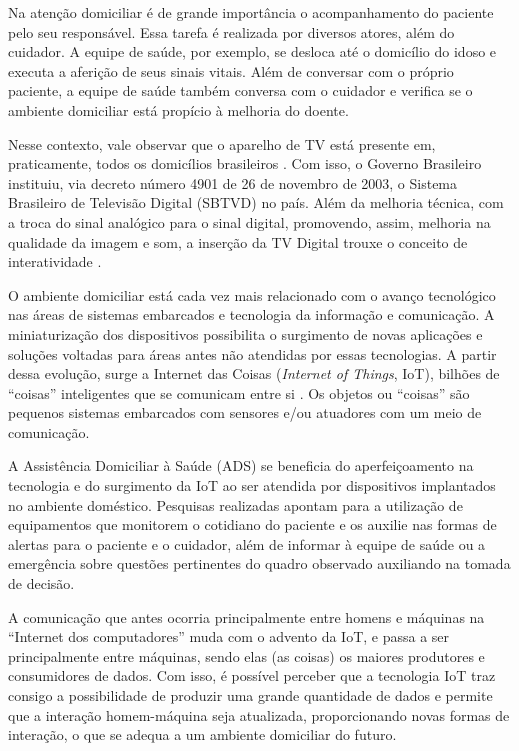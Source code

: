 Na atenção domiciliar é de grande importância o acompanhamento do paciente pelo
seu responsável.  Essa tarefa é realizada por diversos atores, além do
cuidador. A equipe de saúde, por exemplo, se desloca até o domicílio do idoso e
executa a aferição de seus sinais vitais. Além de conversar com o próprio
paciente, a equipe de saúde também conversa com o cuidador e verifica se o
ambiente domiciliar está propício à melhoria do doente.

Nesse contexto, vale observar que o aparelho de TV está presente em,
praticamente, todos os  domicílios brasileiros \cite{ibge2015tv}.  Com isso, o
Governo Brasileiro instituiu, via decreto número 4901 de 26 de novembro de
2003, o Sistema Brasileiro de Televisão Digital (SBTVD) no país.  Além da
melhoria técnica, com a troca do sinal analógico para o sinal  digital,
promovendo, assim, melhoria na qualidade da imagem e som, a inserção  da TV
Digital trouxe o conceito de interatividade \cite{digitaltv2015decree}.

O ambiente domiciliar está cada vez mais relacionado com o avanço tecnológico
nas áreas de sistemas embarcados e tecnologia da informação e comunicação. A
miniaturização dos dispositivos possibilita o surgimento de novas aplicações e
soluções voltadas para áreas antes não atendidas por essas tecnologias.  A
partir dessa evolução, surge a Internet das Coisas (\textit{Internet of
Things}, IoT), bilhões de ``coisas'' inteligentes que se comunicam entre si
\cite{li2015internet}. Os objetos ou ``coisas'' são pequenos sistemas
embarcados com sensores e/ou atuadores com um meio de comunicação. 

A Assistência Domiciliar à Saúde (ADS) se beneficia do aperfeiçoamento na
tecnologia e do surgimento da IoT ao ser atendida por dispositivos implantados
no ambiente doméstico.  Pesquisas realizadas \cite{triantafyllidis2013,moreira2016} 
apontam para a utilização de equipamentos que monitorem o cotidiano do paciente
e os auxilie nas formas de alertas para o paciente e o cuidador, além de
informar à equipe de saúde ou a emergência sobre questões pertinentes do quadro 
observado auxiliando na tomada de decisão.

A comunicação que antes ocorria principalmente entre homens e máquinas na ``Internet
dos computadores'' muda com o advento da IoT, e passa a ser principalmente entre
máquinas, sendo elas (as coisas) os maiores produtores e consumidores de dados.
Com isso, é possível perceber que a tecnologia IoT traz consigo a possibilidade de
produzir uma grande quantidade de dados e permite que a interação homem-máquina
seja atualizada, proporcionando novas formas de interação, o que se adequa a 
um ambiente domiciliar do futuro.

